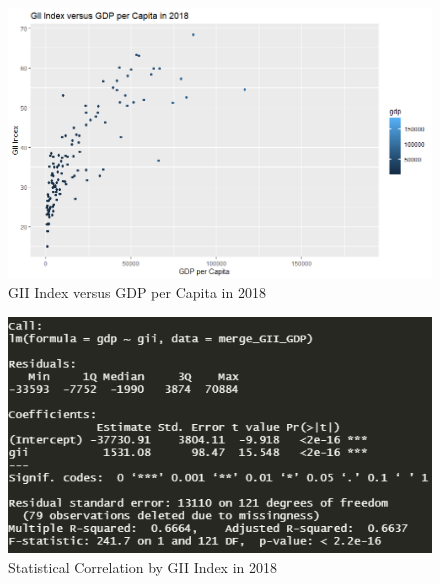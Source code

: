 \documentclass[15pt]{article}
\begin{document}
\begin{figure}[H]
    \centering
    \includegraphics[scale = 0.7]{Part5_GII_GDP.png}
    \caption{GII Index versus GDP per Capita in 2018}
\end{figure}

\begin{figure}[H]
    \centering
    \includegraphics[scale = 0.7]{Part5_GII_GDP_r^2.PNG}
    \caption{Statistical Correlation by GII Index in 2018}
\end{figure}
\end{document}
